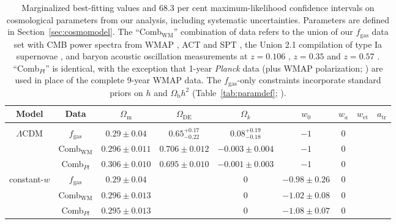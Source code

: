 \documentclass[useAMS,usenatbib,usegraphicx]{mn2e}
\newcommand*{\mysub}[2]{\ensuremath{#1_{\mathrm{#2}}}}
\newcommand*{\phmin}{\hspace{1.9ex}}
\newcommand*{\Omegam}{\mysub{\Omega}{m}}
\newcommand*{\Omegab}{\mysub{\Omega}{b}}
\newcommand*{\Omegade}{\mysub{\Omega}{DE}}
\newcommand*{\fgas}{\mysub{f}{gas}}
\newcommand*{\LCDM}{\ensuremath{\Lambda}CDM}
\newcommand*{\atr}{\mysub{a}{tr}}
\newcommand*{\wet}{\mysub{w}{et}}
\newcommand*{\secref}{Section}
\newcommand*{\tabref}{Table}
\newcommand*{\Planck}{{\it Planck}}
\begin{document}
\begin{table}
  \begin{center}
    \caption{
      Marginalized best-fitting values and 68.3 per cent maximum-likelihood confidence intervals on cosmological parameters from our analysis, including systematic uncertainties. Parameters are defined in \secref~\ref{sec:cosmomodel}. The ``Comb$_\mathrm{WM}$'' combination of data refers to the union of our \fgas{} data set with CMB power spectra from WMAP \citep{Hinshaw1212.5226}, ACT \citep{Das1301.1037} and SPT \citep{Keisler1105.3182, Reichardt1111.0932, Story1210.7231}, the Union 2.1 compilation of type Ia supernovae \citep{Suzuki1105.3470}, and baryon acoustic oscillation measurements at $z=0.106$ \citep{Beutler1106.3366}, $z=0.35$ \citep{Padmanabhan1202.0090} and $z=0.57$ \citep{Anderson1303.4666}. ``Comb$_{Pl}$'' is identical, with the exception that 1-year \Planck{} data (plus WMAP polarization; \citealt{Planck1303.5075}) are used in place of the complete 9-year WMAP data. The \fgas{}-only constraints incorporate standard priors on $h$ and $\Omegab h^2$ (\tabref~\ref{tab:paramdef}; \citealt{Riess1103.2976, Cooke1308.3240}).
    }
    \label{tab:death}
    \vspace{1ex}
    \begin{tabular}{ccccccccc}
      \hline
      Model & Data & \Omegam{} & \Omegade{} & \phmin$\Omega_k$ & $w_0$ & $w_a$ & \wet{} & $\atr$ \\
      \hline\vspace{-1.5ex}\\
      \LCDM{} & \fgas{} & $0.29\pm0.04$ & $0.65^{+0.17}_{-0.22}$ & $0.08^{+0.19}_{-0.18}$ & $-1$ &  \phmin0 & &\vspace{1ex}\\
      & Comb$_\mathrm{WM}$ & $0.296\pm0.011$ & $0.706\pm0.012$ & $-0.003\pm0.004$ & $-1$ &  \phmin0 & &\vspace{1ex}\\
      & Comb$_{Pl}$ & $0.306\pm0.010$ & $0.695\pm0.010$ & $-0.001\pm0.003$ & $-1$ & \phmin0 & &\vspace{1ex}\\
      constant-$w$ & \fgas{} & $0.29\pm0.04$ &  & \phmin0 & $-0.98\pm0.26$ &  \phmin0 & &\vspace{1ex}\\
      & Comb$_\mathrm{WM}$  & $0.296\pm0.013$ &  & \phmin0 & $-1.02\pm0.08$ &  \phmin0 & &\vspace{1ex}\\
      & Comb$_{Pl}$  & $0.295\pm0.013$ &  & \phmin0 & $-1.08\pm0.07$ & \phmin0 & &\vspace{1ex}\\

\end{tabular}
\end{center}
\end{table}
\end{document}
